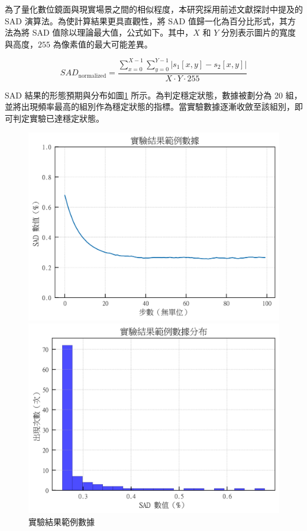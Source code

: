 \documentclass[12pt]{article}
\begin{document}
為了量化數位鏡面與現實場景之間的相似程度，本研究採用前述文獻探討中提及的 SAD 演算法。為使計算結果更具直觀性，將 SAD 值歸一化為百分比形式，其方法為將 SAD 值除以理論最大值，公式如下。其中，$X$ 和 $Y$ 分別表示圖片的寬度與高度，$255$ 為像素值的最大可能差異。

\[
SAD_{\text{normalized}} = \frac{\sum_{x=0}^{X-1} \sum_{y=0}^{Y-1} \left| s_1[x, y] - s_2[x, y] \right|}{X \cdot Y \cdot 255}
\]

SAD 結果的形態預期與分布如圖\ref{fig:test_img2} 所示。為判定穩定狀態，數據被劃分為 20 組，並將出現頻率最高的組別作為穩定狀態的指標。當實驗數據逐漸收斂至該組別，即可判定實驗已達穩定狀態。

\begin{figure}[htbp]
  \centering
  \begin{minipage}[b]{0.45\textwidth}
    \centering
    \includegraphics[width=\textwidth]{img/SAD_expriment_example_1.png}
  \end{minipage}
  \hfill
  \begin{minipage}[b]{0.45\textwidth}
    \centering
    \includegraphics[width=\textwidth]{img/SAD_expriment_example_2.png}
  \end{minipage}
  \caption{實驗結果範例數據}\label{fig:test_img2}

\end{figure}
\end{document}
